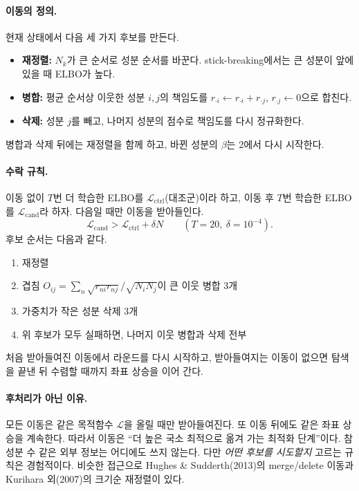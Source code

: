 \documentclass[11pt]{article}
\begin{document}
\paragraph{이동의 정의.}
현재 상태에서 다음 세 가지 후보를 만든다.
\begin{itemize}
  \item \textbf{재정렬:} $N_k$가 큰 순서로 성분 순서를 바꾼다. stick-breaking에서는 큰 성분이 앞에 있을 때 ELBO가 높다.
  \item \textbf{병합:} 평균 순서상 이웃한 성분 $i,j$의 책임도를 $r_{\cdot i}\leftarrow r_{\cdot i}+r_{\cdot j}$, $r_{\cdot j}\leftarrow0$으로 합친다.
  \item \textbf{삭제:} 성분 $j$를 빼고, 나머지 성분의 점수로 책임도를 다시 정규화한다.
\end{itemize}
병합과 삭제 뒤에는 재정렬을 함께 하고, 바뀐 성분의 $\beta$는 2에서 다시 시작한다.

\paragraph{수락 규칙.}
이동 없이 $T$번 더 학습한 ELBO를 $\mathcal{L}_{\mathrm{ctrl}}$(대조군)이라 하고, 이동 후 $T$번 학습한 ELBO를 $\mathcal{L}_{\mathrm{cand}}$라 하자. 다음일 때만 이동을 받아들인다.
\begin{equation}
  \mathcal{L}_{\mathrm{cand}}>\mathcal{L}_{\mathrm{ctrl}}+\delta N \qquad (T=20,\ \delta=10^{-4}).
\end{equation}
후보 순서는 다음과 같다.
\begin{enumerate}
  \item 재정렬
  \item 겹침 $O_{ij}=\sum_n\sqrt{r_{ni}r_{nj}}\big/\sqrt{N_iN_j}$이 큰 이웃 병합 3개
  \item 가중치가 작은 성분 삭제 3개
  \item 위 후보가 모두 실패하면, 나머지 이웃 병합과 삭제 전부
\end{enumerate}
처음 받아들여진 이동에서 라운드를 다시 시작하고, 받아들여지는 이동이 없으면 탐색을 끝낸 뒤 수렴할 때까지 좌표 상승을 이어 간다.

\paragraph{후처리가 아닌 이유.}
모든 이동은 같은 목적함수 $\mathcal{L}$을 올릴 때만 받아들여진다. 또 이동 뒤에도 같은 좌표 상승을 계속한다. 따라서 이동은 ``더 높은 국소 최적으로 옮겨 가는 최적화 단계''이다.
참 성분 수 같은 외부 정보는 어디에도 쓰지 않는다.
다만 \emph{어떤 후보를 시도할지} 고르는 규칙은 경험적이다. 비슷한 접근으로 Hughes \& Sudderth(2013)의 merge/delete 이동과 Kurihara 외(2007)의 크기순 재정렬이 있다.
\end{document}

